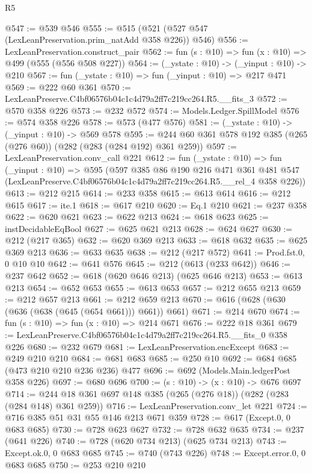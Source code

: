 \begin{lexlean}{R5}
\begin{coremodule}
@547 := @539 @546
@555 := @515 (@521 (@527 @547 (LexLeanPreservation.prim_natAdd @358 @226)) @546)
@556 := LexLeanPreservation.construct_pair
@562 := fun (s : @10) => fun (x : @10) => @499 (@555 (@556 @508 @227))
@564 := (_ystate : @10) -> (_yinput : @10) -> @210
@567 := fun (_ystate : @10) => fun (_yinput : @10) => @217 @471
@569 := @222 @60 @361
@570 := LexLeanPreserve.C4bf06576b04c1c4d79a2ff7c219cc264.R5.__fits_3
@572 := @570 @358 @226
@573 := @232 @572
@574 := Models.Ledger.SpillModel
@576 := @574 @358 @226
@578 := @573 (@477 @576)
@581 := (_ystate : @10) -> (_yinput : @10) -> @569 @578
@595 := @244 @60 @361 @578 @192 @385 (@265 (@276 @60)) (@282 (@283 (@284 @192) @361 @259))
@597 := LexLeanPreservation.conv_call @221
@612 := fun (_ystate : @10) =>
  fun (_yinput : @10) =>
  @595
    (@597
      @385
      @86
      @190
      @216
      @471
      @361
      @481
      @547
      (LexLeanPreserve.C4bf06576b04c1c4d79a2ff7c219cc264.R5.__rel_4 @358 @226))
@613 := @212 @215
@614 := @233 @358
@615 := @613 @614
@616 := @212 @615
@617 := ite.{1}
@618 := @617 @210
@620 := Eq.{1} @210
@621 := @237 @358
@622 := @620 @621
@623 := @622 @213
@624 := @618 @623
@625 := instDecidableEqBool
@627 := @625 @621 @213
@628 := @624 @627
@630 := @212 (@217 @365)
@632 := @620 @369 @213
@633 := @618 @632
@635 := @625 @369 @213
@636 := @633 @635
@638 := @212 (@217 @572)
@641 := Prod.fst.{0, 0} @10 @10
@642 := @641 @576
@645 := @212 (@613 (@233 @642))
@646 := @237 @642
@652 := @618 (@620 @646 @213) (@625 @646 @213)
@653 := @613 @213
@654 := @652 @653
@655 := @613 @653
@657 := @212 @655 @213
@659 := @212 @657 @213
@661 := @212 @659 @213
@670 := @616 (@628 (@630 (@636 (@638 (@645 (@654 @661))) @661)) @661)
@671 := @214 @670
@674 := fun (s : @10) => fun (x : @10) => @214 @671
@676 := @222 @18 @361
@679 := LexLeanPreserve.C4bf06576b04c1c4d79a2ff7c219cc264.R5.__fits_0 @358 @226
@680 := @232 @679
@681 := LexLeanPreservation.encExcept
@683 := @249 @210 @210
@684 := @681 @683
@685 := @250 @10
@692 := @684 @685 (@473 @210 @210 @236 @236) @477
@696 := @692 (Models.Main.ledgerPost @358 @226)
@697 := @680 @696
@700 := (s : @10) -> (x : @10) -> @676 @697
@714 := @244 @18 @361 @697 @148 @385 (@265 (@276 @18)) (@282 (@283 (@284 @148) @361 @259))
@716 := LexLeanPreservation.conv_let @221
@724 := @716 @385 @51 @31 @55 @146 @213 @671 @359
@728 := @617 (Except.{0, 0} @683 @685)
@730 := @728 @623 @627
@732 := @728 @632 @635
@734 := @237 (@641 @226)
@740 := @728 (@620 @734 @213) (@625 @734 @213)
@743 := Except.ok.{0, 0} @683 @685
@745 := @740 (@743 @226)
@748 := Except.error.{0, 0} @683 @685
@750 := @253 @210 @210

\end{coremodule}
\end{lexlean}
